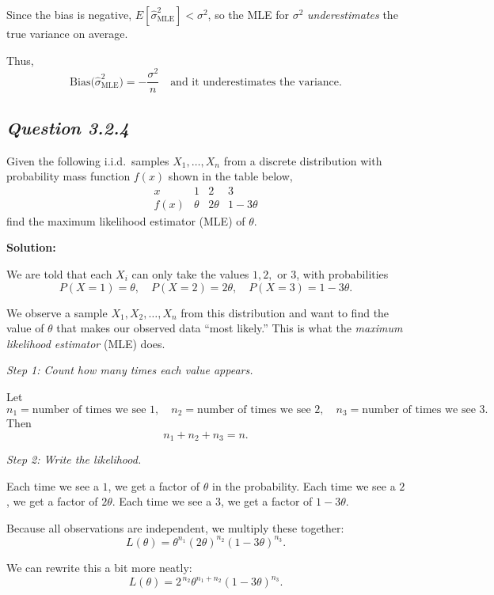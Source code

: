\documentclass[11pt,letterpaper]{article}
\theoremstyle{remark}
\begin{document}
Since the bias is negative, $E[\hat{\sigma}^2_{\mathrm{MLE}}] < \sigma^2$, so the MLE for $\sigma^2$ \emph{underestimates} the true variance on average.

Thus,
\[
\boxed{\text{Bias}\bigl(\hat{\sigma}^2_{\mathrm{MLE}}\bigr)
      = -\frac{\sigma^2}{n}
      \quad\text{and it underestimates the variance.}}
\]

\newpage

\subsection*{\textbf{\textit{Question 3.2.4}}}

Given the following i.i.d.\ samples $X_1, \ldots, X_n$ from a discrete distribution with probability mass function $f(x)$ shown in the table below,
\[
\begin{array}{c|ccc}
x & 1 & 2 & 3 \\ \hline
f(x) & \theta & 2\theta & 1 - 3\theta
\end{array}
\]
find the maximum likelihood estimator (MLE) of $\theta$.

\vspace{1cm}

\textbf{Solution:}

We are told that each $X_i$ can only take the values $1, 2,$ or $3$, with probabilities
\[
P(X=1) = \theta, \quad P(X=2) = 2\theta, \quad P(X=3) = 1 - 3\theta.
\]

We observe a sample $X_1, X_2, \ldots, X_n$ from this distribution and want to find the value of $\theta$ that makes our observed data ``most likely.'' This is what the \emph{maximum likelihood estimator} (MLE) does.

\medskip
\textit{Step 1: Count how many times each value appears.}

Let
\[
n_1 = \text{number of times we see } 1, \quad
n_2 = \text{number of times we see } 2, \quad
n_3 = \text{number of times we see } 3.
\]
Then
\[
n_1 + n_2 + n_3 = n.
\]

\medskip
\textit{Step 2: Write the likelihood.}

Each time we see a $1$, we get a factor of $\theta$ in the probability.
Each time we see a $2$, we get a factor of $2\theta$.
Each time we see a $3$, we get a factor of $1 - 3\theta$.

Because all observations are independent, we multiply these together:
\[
L(\theta)
= \theta^{n_1} (2\theta)^{n_2} (1 - 3\theta)^{n_3}.
\]

We can rewrite this a bit more neatly:
\[
L(\theta)
= 2^{\,n_2} \theta^{n_1 + n_2} (1 - 3\theta)^{n_3}.
\]
\end{document}
